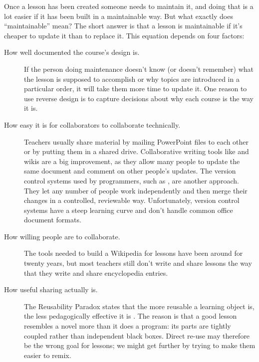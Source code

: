 
Once a lesson has been created someone needs to maintain it,
and doing that is a lot easier if it has been built in a maintainable way.
But what exactly does ``maintainable'' mean?
The short answer is that a lesson is maintainable
if it's cheaper to update it than to replace it.
This equation depends on four factors:

\begin{description}

\item[How well documented the course's design is.]
  If the person doing maintenance doesn't know (or doesn't remember)
  what the lesson is supposed to accomplish
  or why topics are introduced in a particular order,
  it will take them more time to update it.
  One reason to use reverse design
  is to capture decisions about why each course is the way it is.

\item[How easy it is for collaborators to collaborate technically.]
  Teachers usually share material by mailing PowerPoint files to each other
  or by putting them in a shared drive.
  Collaborative writing tools like  and wikis
  are a big improvement,
  as they allow many people to update the same document and comment on other people's updates.
  The version control systems used by programmers,
  such as ,
  are another approach.
  They let any number of people work independently
  and then merge their changes in a controlled, reviewable way.
  Unfortunately,
  version control systems have a steep learning curve
  and don't handle common office document formats.

\item[How willing people are to collaborate.]
  The tools needed to build a Wikipedia for lessons have been around for twenty years,
  but most teachers still don't write and share lessons
  the way that they write and share encyclopedia entries.

\item[How useful sharing actually is.]
  The Reusability Paradox states that the more reusable a learning object is,
  the less pedagogically effective it is \cite{Wile2002}.
  The reason is that a good lesson resembles a novel more than it does a program:
  its parts are tightly coupled rather than independent black boxes.
  Direct re-use may therefore be the wrong goal for lessons;
  we might get further by trying to make them easier to remix.

\end{description}

